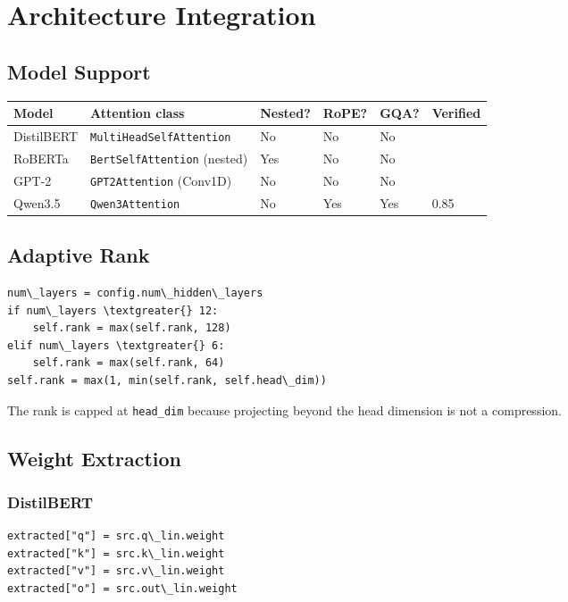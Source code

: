 
\section{Architecture Integration}

\subsection{Model Support}

\begin{table}[H]
\centering
\small
\begin{tabular}{llllll}
\toprule
\textbf{Model} & \textbf{Attention class} & \textbf{Nested?} & \textbf{RoPE?} & \textbf{GQA?} & \textbf{Verified} \\
\midrule
DistilBERT & \texttt{MultiHeadSelfAttention} & No & No & No &  \\
RoBERTa & \texttt{BertSelfAttention} (nested) & Yes & No & No &  \\
GPT-2 & \texttt{GPT2Attention} (Conv1D) & No & No & No &  \\
Qwen3.5 & \texttt{Qwen3Attention} & No & Yes & Yes & 0.85 \\
\bottomrule
\end{tabular}
\end{table}

\subsection{Adaptive Rank}

\begin{lstlisting}
num\_layers = config.num\_hidden\_layers
if num\_layers \textgreater{} 12:
    self.rank = max(self.rank, 128)
elif num\_layers \textgreater{} 6:
    self.rank = max(self.rank, 64)
self.rank = max(1, min(self.rank, self.head\_dim))
\end{lstlisting}

The rank is capped at \texttt{head\_dim} because projecting beyond the head 
dimension is not a compression.

\subsection{Weight Extraction}

\subsubsection{DistilBERT}

\begin{lstlisting}
extracted["q"] = src.q\_lin.weight
extracted["k"] = src.k\_lin.weight
extracted["v"] = src.v\_lin.weight
extracted["o"] = src.out\_lin.weight
\end{lstlisting}

